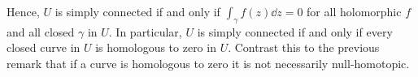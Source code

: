 Hence, \( U \) is simply connected if and only if \( \int_\gamma f(z) \dd{z} = 0 \) for all holomorphic \( f \) and all closed \( \gamma \) in \( U \).
In particular, \( U \) is simply connected if and only if every closed curve in \( U \) is homologous to zero in \( U \).
Contrast this to the previous remark that if a curve is homologous to zero it is not necessarily null-homotopic.
